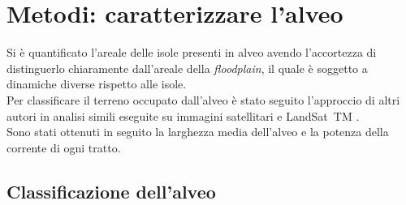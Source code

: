\section{Metodi: caratterizzare l'alveo}
Si è quantificato l'areale delle isole presenti in alveo avendo l'accortezza di distinguerlo chiaramente dall'areale della \emph{floodplain}, il quale è soggetto a dinamiche diverse rispetto alle isole.
\\
Per classificare il terreno occupato dall'alveo è stato seguito l'approccio di altri autori in analisi simili eseguite su immagini satellitari \AST{} e LandSat~TM .
\\
Sono stati ottenuti in seguito la larghezza media dell'alveo e la potenza della corrente di ogni tratto.

\subsection{Classificazione dell'alveo}
